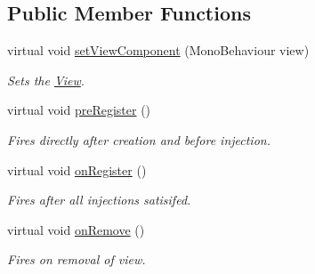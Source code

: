 \subsection*{Public Member Functions}
\begin{DoxyCompactItemize}
\item 
\hypertarget{classstrange_1_1extensions_1_1mediation_1_1impl_1_1_mediator_aece12daee53614f5cba269a0ebb4d871}{virtual void \hyperlink{classstrange_1_1extensions_1_1mediation_1_1impl_1_1_mediator_aece12daee53614f5cba269a0ebb4d871}{set\-View\-Component} (Mono\-Behaviour view)}\label{classstrange_1_1extensions_1_1mediation_1_1impl_1_1_mediator_aece12daee53614f5cba269a0ebb4d871}

\begin{DoxyCompactList}\small\item\em Sets the \hyperlink{classstrange_1_1extensions_1_1mediation_1_1impl_1_1_view}{View}. \end{DoxyCompactList}\item 
\hypertarget{classstrange_1_1extensions_1_1mediation_1_1impl_1_1_mediator_a284db743d4cdf5d75d34fbad151eaf99}{virtual void \hyperlink{classstrange_1_1extensions_1_1mediation_1_1impl_1_1_mediator_a284db743d4cdf5d75d34fbad151eaf99}{pre\-Register} ()}\label{classstrange_1_1extensions_1_1mediation_1_1impl_1_1_mediator_a284db743d4cdf5d75d34fbad151eaf99}

\begin{DoxyCompactList}\small\item\em Fires directly after creation and before injection. \end{DoxyCompactList}\item 
virtual void \hyperlink{classstrange_1_1extensions_1_1mediation_1_1impl_1_1_mediator_a27b0053397aac6c6136b1794b10718de}{on\-Register} ()
\begin{DoxyCompactList}\small\item\em Fires after all injections satisifed. \end{DoxyCompactList}\item 
virtual void \hyperlink{classstrange_1_1extensions_1_1mediation_1_1impl_1_1_mediator_a9c65534ae8c37db9f4db7c84a94cd635}{on\-Remove} ()
\begin{DoxyCompactList}\small\item\em Fires on removal of view. \end{DoxyCompactList}\end{DoxyCompactItemize}
